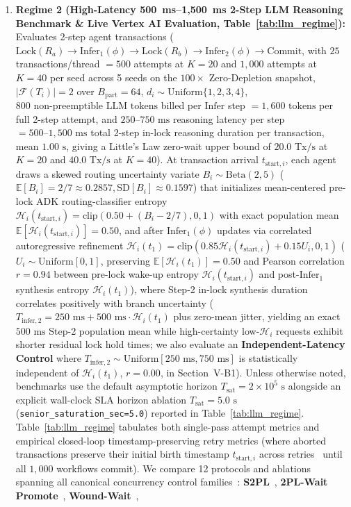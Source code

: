 \documentclass[conference,10pt]{IEEEtran}
\begin{document}
\begin{enumerate}
    \item \textbf{Regime 2 (High-Latency 500~ms--1,500~ms 2-Step LLM Reasoning Benchmark \& Live Vertex AI Evaluation, Table~\ref{tab:llm_regime}):} Evaluates 2-step agent transactions ($\text{Lock}(R_a) \to \text{Infer}_1(\phi) \to \text{Lock}(R_b) \to \text{Infer}_2(\phi) \to \text{Commit}$, with $25$ transactions/thread $= 500$ attempts at $K=20$ and $1{,}000$ attempts at $K=40$ per seed across 5 seeds on the $100\times$ Zero-Depletion snapshot, $|\mathcal{F}(T_i)| = 2$ over $B_{\text{part}}=64$, $d_i \sim \text{Uniform}\{1, 2, 3, 4\}$, $800\text{ non-preemptible LLM tokens}$ billed per $\text{Infer}$ step $= 1{,}600\text{ tokens}$ per full 2-step attempt, and $250\text{--}750\text{ ms}$ reasoning latency per step $= 500\text{--}1{,}500\text{ ms}$ total 2-step in-lock reasoning duration per transaction, mean $1.00\text{ s}$, giving a Little's Law zero-wait upper bound of $20.0\text{ Tx/s}$ at $K=20$ and $40.0\text{ Tx/s}$ at $K=40$). At transaction arrival $t_{\text{start},i}$, each agent draws a skewed routing uncertainty variate $B_i \sim \text{Beta}(2, 5)$ ($\mathbb{E}[B_i]=2/7 \approx 0.2857, \text{SD}[B_i] \approx 0.1597$) that initializes mean-centered pre-lock ADK routing-classifier entropy $\mathcal{H}_i(t_{\text{start},i}) = \text{clip}(0.50 + (B_i - 2/7), 0, 1)$ with exact population mean $\mathbb{E}[\mathcal{H}_i(t_{\text{start},i})] = 0.50$, and after $\text{Infer}_1(\phi)$ updates via correlated autoregressive refinement $\mathcal{H}_i(t_1) = \text{clip}(0.85 \mathcal{H}_i(t_{\text{start},i}) + 0.15 U_i, 0, 1)$ ($U_i \sim \text{Uniform}[0, 1]$, preserving $\mathbb{E}[\mathcal{H}_i(t_1)] = 0.50$ and Pearson correlation $r = 0.94$ between pre-lock wake-up entropy $\mathcal{H}_i(t_{\text{start},i})$ and post-$\text{Infer}_1$ synthesis entropy $\mathcal{H}_i(t_1)$), where Step-2 in-lock synthesis duration correlates positively with branch uncertainty ($T_{\text{infer},2} = 250\text{ ms} + 500\text{ ms} \cdot \mathcal{H}_i(t_1)$ plus zero-mean jitter, yielding an exact $500\text{ ms}$ Step-2 population mean while high-certainty low-$\mathcal{H}_i$ requests exhibit shorter residual lock hold times; we also evaluate an \textbf{Independent-Latency Control} where $T_{\text{infer},2} \sim \text{Uniform}[250\text{ ms}, 750\text{ ms}]$ is statistically independent of $\mathcal{H}_i(t_1)$, $r=0.00$, in Section~V-B1). Unless otherwise noted, benchmarks use the default asymptotic horizon $T_{\text{sat}} = 2\times 10^5\text{ s}$ alongside an explicit wall-clock SLA horizon ablation $T_{\text{sat}} = 5.0\text{ s}$ (\texttt{senior\_saturation\_sec=5.0}) reported in Table~\ref{tab:llm_regime}. Table~\ref{tab:llm_regime} tabulates both single-pass attempt metrics and empirical closed-loop timestamp-preserving retry metrics (where aborted transactions preserve their initial birth timestamp $t_{\text{start},i}$ across retries~\cite{rosenkrantz1978system} until all $1{,}000$ workflows commit). We compare 12 protocols and ablations spanning all canonical concurrency control families~\cite{harding2017evaluation}: \textbf{S2PL}~\cite{eswaran1976notions}, \textbf{2PL-Wait Promote}~\cite{abbott1992scheduling}, \textbf{Wound-Wait}~\cite{rosenkrantz1978system, corbett2013spanner}, 
\end{enumerate}
\end{document}

